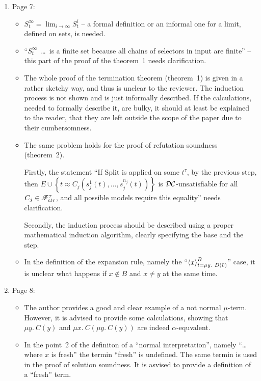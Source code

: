 \begin{enumerate}
	\item Page 7:
	\begin{itemize}
		\item $S_t^\infty = \lim_{i \rightarrow \infty} S^i_t$ -- a formal definition or an informal one for a limit, defined on sets, is needed.
		\item ``$S_t^\infty$~\dots~is a finite set because all chains of selectors in input are finite'' -- this part of the proof of the theorem~1 needs clarification.
		
		\item The whole proof of the termination theorem (theorem~1) is given in a rather sketchy way, and thus is unclear to the reviewer. The induction process is not shown and is just informally described. If the calculations, needed to formally describe it, are bulky, it should at least be explained to the reader, that they are left outside the scope of the paper due to their cumbersomness.
		
		\item The same problem holds for the proof of refutation soundness (theorem~2).


		Firstly, the statement ``If $\mathrm{Split}$ is applied on some $t^\tau$, by the previous step, then $E \cup \left\{ t \approx C_j\left( s_j^1(t),\dots,s_j^{n_j}(t) \right) \right\}$ is $\mathcal{DC}$-unsatisfiable for all $C_j \in \mathscr{F}^\tau_{ctr}$, and all possible models require this equality'' needs clarification.


		Secondly, the induction process should be described using a proper mathematical induction algorithm, clearly specifying the base and the step.

		\item In the definition of the expansion rule, namely the ``$\left\langle x \right\rangle^B_{t = \mu y.\ D(\bar{v})}$'' case, it is unclear what happens if $x \notin B$ and $x \ne y$ at the same time.
	\end{itemize}

	\item Page 8:
	\begin{itemize}
		\item The author provides a good and clear example of a not normal $\mu$-term. However, it is advised to provide some calculations, showing that $\mu y.\ C(y)$ and $\mu x.\ C(\mu y.\ C(y))$ are indeed $\alpha$-equvalent.

		\item In the point~2 of the definiton of a ``normal interpretation'', namely ``\dots where $x$ is fresh'' the termin ``fresh'' is undefined. The same termin is used in the proof of solution soundness. It is asvised to provide a definition of a ``fresh'' term.
	\end{itemize}


\end{enumerate}
